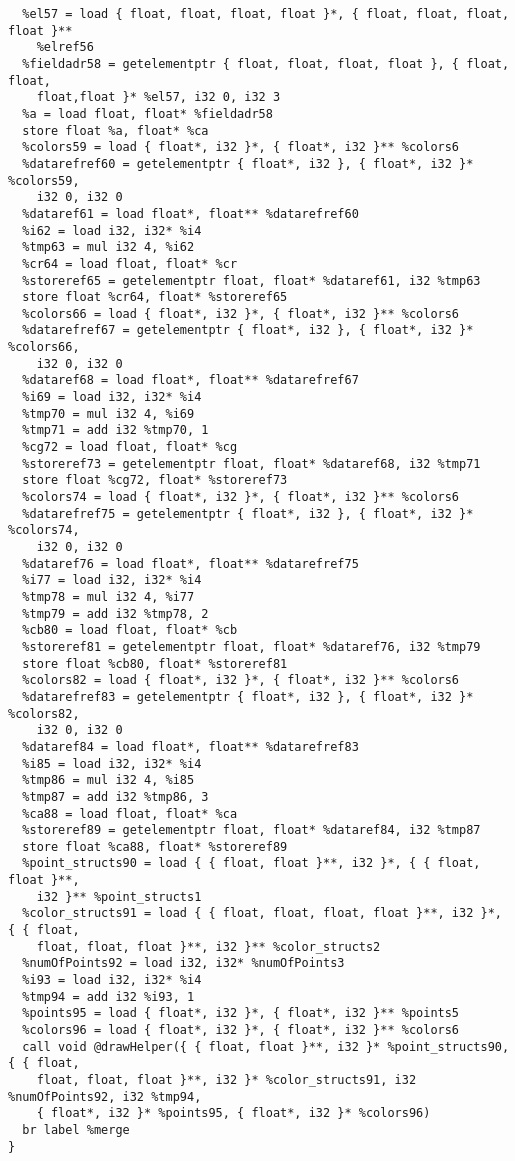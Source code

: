 \documentclass[main.tex]{subfiles}
\begin{document}
{\begin{lstlisting}
  %el57 = load { float, float, float, float }*, { float, float, float, float }** 
    %elref56
  %fieldadr58 = getelementptr { float, float, float, float }, { float, float,
    float,float }* %el57, i32 0, i32 3
  %a = load float, float* %fieldadr58
  store float %a, float* %ca
  %colors59 = load { float*, i32 }*, { float*, i32 }** %colors6
  %datarefref60 = getelementptr { float*, i32 }, { float*, i32 }* %colors59, 
    i32 0, i32 0
  %dataref61 = load float*, float** %datarefref60
  %i62 = load i32, i32* %i4
  %tmp63 = mul i32 4, %i62
  %cr64 = load float, float* %cr
  %storeref65 = getelementptr float, float* %dataref61, i32 %tmp63
  store float %cr64, float* %storeref65
  %colors66 = load { float*, i32 }*, { float*, i32 }** %colors6
  %datarefref67 = getelementptr { float*, i32 }, { float*, i32 }* %colors66, 
    i32 0, i32 0
  %dataref68 = load float*, float** %datarefref67
  %i69 = load i32, i32* %i4
  %tmp70 = mul i32 4, %i69
  %tmp71 = add i32 %tmp70, 1
  %cg72 = load float, float* %cg
  %storeref73 = getelementptr float, float* %dataref68, i32 %tmp71
  store float %cg72, float* %storeref73
  %colors74 = load { float*, i32 }*, { float*, i32 }** %colors6
  %datarefref75 = getelementptr { float*, i32 }, { float*, i32 }* %colors74,
    i32 0, i32 0
  %dataref76 = load float*, float** %datarefref75
  %i77 = load i32, i32* %i4
  %tmp78 = mul i32 4, %i77
  %tmp79 = add i32 %tmp78, 2
  %cb80 = load float, float* %cb
  %storeref81 = getelementptr float, float* %dataref76, i32 %tmp79
  store float %cb80, float* %storeref81
  %colors82 = load { float*, i32 }*, { float*, i32 }** %colors6
  %datarefref83 = getelementptr { float*, i32 }, { float*, i32 }* %colors82,
    i32 0, i32 0
  %dataref84 = load float*, float** %datarefref83
  %i85 = load i32, i32* %i4
  %tmp86 = mul i32 4, %i85
  %tmp87 = add i32 %tmp86, 3
  %ca88 = load float, float* %ca
  %storeref89 = getelementptr float, float* %dataref84, i32 %tmp87
  store float %ca88, float* %storeref89
  %point_structs90 = load { { float, float }**, i32 }*, { { float, float }**,
    i32 }** %point_structs1
  %color_structs91 = load { { float, float, float, float }**, i32 }*, { { float,
    float, float, float }**, i32 }** %color_structs2
  %numOfPoints92 = load i32, i32* %numOfPoints3
  %i93 = load i32, i32* %i4
  %tmp94 = add i32 %i93, 1
  %points95 = load { float*, i32 }*, { float*, i32 }** %points5
  %colors96 = load { float*, i32 }*, { float*, i32 }** %colors6
  call void @drawHelper({ { float, float }**, i32 }* %point_structs90, { { float,
    float, float, float }**, i32 }* %color_structs91, i32 %numOfPoints92, i32 %tmp94,
    { float*, i32 }* %points95, { float*, i32 }* %colors96)
  br label %merge
}


\end{lstlisting}}
\end{document}
